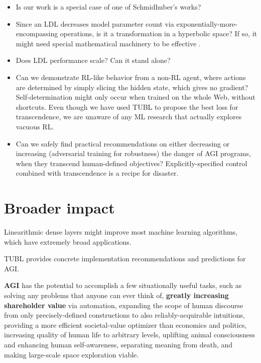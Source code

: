 \documentclass{article}
\begin{document}
\begin{itemize}
\item Is our work is a special case of one of Schmidhuber's works?

\item Since an LDL decreases model parameter count via exponentially-more-encompassing operations, is it a transformation in a hyperbolic space? If so, it might need special mathematical machinery to be effective \cite{peng2021hyperbolic}.

\item Does LDL performance scale? Can it stand alone?

\item Can we demonstrate RL-like behavior from a non-RL agent, where actions are determined by simply slicing the hidden state, which gives no gradient? Self-determination might only occur when trained on the whole Web, without shortcuts. Even though we have used TUBL to propose the best loss for transcendence, we are unaware of any ML research that actually explores vacuous RL.

\item Can we safely find practical recommendations on either decreasing or increasing (adversarial training for robustness) the danger of AGI programs, when they transcend human-defined objectives? Explicitly-specified control combined with transcendence is a recipe for disaster.
\end{itemize}

\section{Broader impact}


Linearithmic dense layers might improve most machine learning algorithms, which have extremely broad applications.

TUBL provides concrete implementation recommendations and predictions for AGI.

\textbf{AGI} has the potential to accomplish a few situationally useful tasks, such as solving any problems that anyone can ever think of, \textbf{greatly increasing shareholder value} via automation, expanding the scope of human discourse from only precisely-defined constructions to also reliably-acquirable intuitions, providing a more efficient societal-value optimizer than economics and politics, increasing quality of human life to arbitrary levels, uplifting animal consciousness and enhancing human self-awareness, separating meaning from death, and making large-scale space exploration viable.
\end{document}
